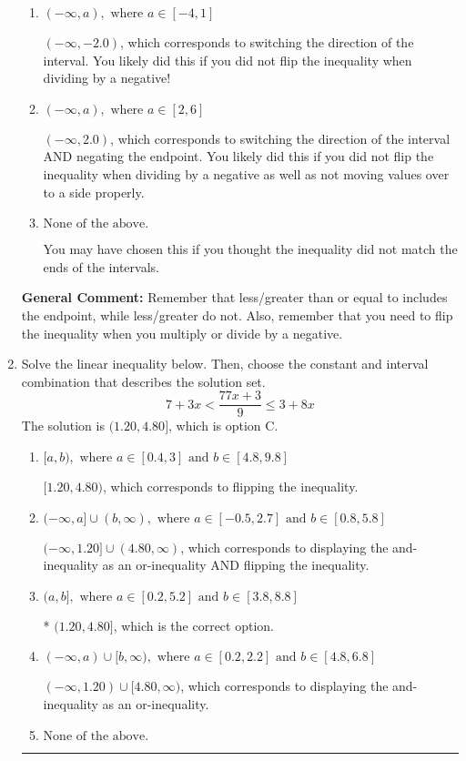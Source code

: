 \documentclass{extbook}[14pt]
\newcommand{\litem}[1]{\item #1

\rule{\textwidth}{0.4pt}}
\begin{document}
\begin{enumerate}
{\begin{enumerate}[label=\Alph*.]
 $(2.0, \infty)$, which corresponds to negating the endpoint of the solution.
\item \( (-\infty, a), \text{ where } a \in [-4, 1] \)

 $(-\infty, -2.0)$, which corresponds to switching the direction of the interval. You likely did this if you did not flip the inequality when dividing by a negative!
\item \( (-\infty, a), \text{ where } a \in [2, 6] \)

 $(-\infty, 2.0)$, which corresponds to switching the direction of the interval AND negating the endpoint. You likely did this if you did not flip the inequality when dividing by a negative as well as not moving values over to a side properly.
\item \( \text{None of the above}. \)

You may have chosen this if you thought the inequality did not match the ends of the intervals.
\end{enumerate}

\textbf{General Comment:} Remember that less/greater than or equal to includes the endpoint, while less/greater do not. Also, remember that you need to flip the inequality when you multiply or divide by a negative.
}
\litem{
Solve the linear inequality below. Then, choose the constant and interval combination that describes the solution set.
\[ 7 + 3 x < \frac{77 x + 3}{9} \leq 3 + 8 x \]The solution is \( (1.20, 4.80] \), which is option C.\begin{enumerate}[label=\Alph*.]
\item \( [a, b), \text{ where } a \in [0.4, 3] \text{ and } b \in [4.8, 9.8] \)

$[1.20, 4.80)$, which corresponds to flipping the inequality.
\item \( (-\infty, a] \cup (b, \infty), \text{ where } a \in [-0.5, 2.7] \text{ and } b \in [0.8, 5.8] \)

$(-\infty, 1.20] \cup (4.80, \infty)$, which corresponds to displaying the and-inequality as an or-inequality AND flipping the inequality.
\item \( (a, b], \text{ where } a \in [0.2, 5.2] \text{ and } b \in [3.8, 8.8] \)

* $(1.20, 4.80]$, which is the correct option.
\item \( (-\infty, a) \cup [b, \infty), \text{ where } a \in [0.2, 2.2] \text{ and } b \in [4.8, 6.8] \)

$(-\infty, 1.20) \cup [4.80, \infty)$, which corresponds to displaying the and-inequality as an or-inequality.
\item \( \text{None of the above.} \)



\end{enumerate}}
\end{enumerate}
\end{document}
